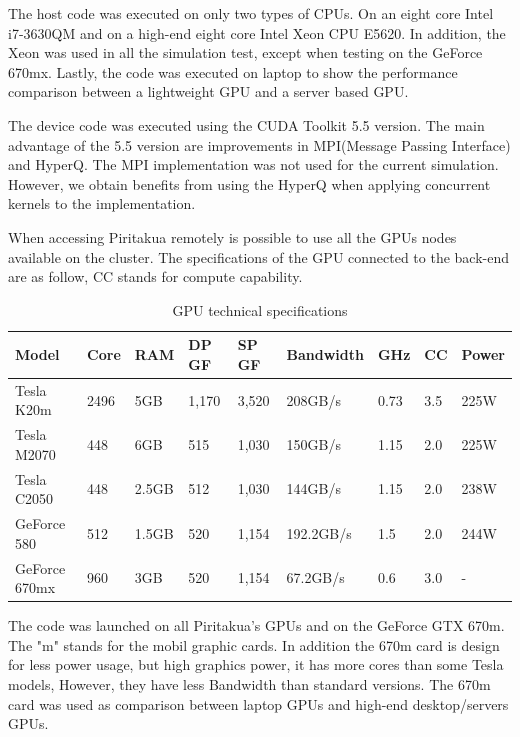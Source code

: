 The host code was executed on only two types of CPUs. On an eight core Intel i7-3630QM and on a high-end eight core Intel Xeon CPU E5620. In addition, the Xeon was used in all the simulation test, except when testing on the GeForce 670mx. Lastly, the code was executed on laptop to show the performance comparison between a lightweight GPU and a server based GPU.

The device code was executed using the CUDA Toolkit 5.5 version. The main advantage of the 5.5 version are improvements in MPI(Message Passing Interface) and HyperQ. The MPI implementation was not used for the current simulation. However, we obtain benefits from using the HyperQ when applying concurrent kernels to the implementation. 

When accessing Piritakua remotely is possible to use all the GPUs nodes available on the cluster. The specifications of the GPU connected to the back-end are as follow, CC stands for compute capability.

\begin{table}[h]
\centering
  \begin{tabular}{ |  l  |  l  |  l  |  l  |  l  | l | l | l |l | }
    \hline
    Model & Core& RAM& DP GF& SP GF& Bandwidth& GHz& CC & Power\\
    \hline
    Tesla K20m & 2496 & 5GB & 1,170 & 3,520 & 208GB/s & 0.73 & 3.5 & 225W \\
   \hline
    Tesla M2070 & 448 & 6GB & 515 & 1,030 & 150GB/s & 1.15 &  2.0 & 225W\\
   \hline
     Tesla C2050 & 448 & 2.5GB & 512 & 1,030 & 144GB/s & 1.15  & 2.0 & 238W \\
   \hline
      GeForce 580 & 512 & 1.5GB & 520 & 1,154 & 192.2GB/s & 1.5 & 2.0 & 244W \\
   \hline
   GeForce 670mx & 960 & 3GB & 520 & 1,154 & 67.2GB/s & 0.6 & 3.0 &  - \\
   \hline
  \end{tabular}
    \caption{GPU technical specifications}
  \label{tab:gpus}
  \end{table}
  
The code was launched on all Piritakua's GPUs and on the GeForce GTX 670m. The "m" stands for the mobil graphic cards. In addition the 670m card is design for less power usage, but high graphics power, it has more cores than some Tesla models, However, they have less Bandwidth than standard versions. The 670m card was used as comparison between laptop GPUs and high-end desktop/servers GPUs.
     

